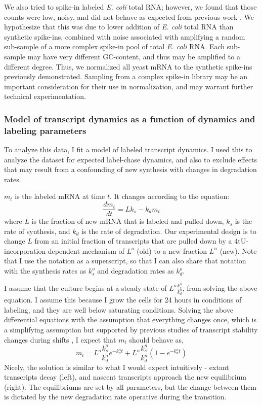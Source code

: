 We also tried to spike-in labeled \textit{E. coli} total RNA; 
however, we found
that those counts were low, noisy, and did not behave as expected
from previous work \parencite{neymotin2014determination}. We
hypothesize that this was due to lower addition of \textit{E. coli} 
total RNA than synthetic spike-ins, 
combined with noise associated with amplifying a
random sub-sample of a more complex spike-in pool of total \textit{E.
coli} RNA. Each sub-sample may have very different GC-content, and
thus may be amplified to a different degree.
Thus, we normalized all yeast mRNA to the synthetic spike-ins previously
demonstrated.
Sampling from a complex spike-in library may be an important
consideration for their use in normalization, and may warrant further
technical experimentation.

\subsubsection{Model of transcript dynamics as a function of 
dynamics and labeling parameters}

To analyze this data, I fit a model of 
labeled transcript dynamics.
I used this to analyze the dataset for expected label-chase
dynamics, and also to exclude effects that may result from a
confounding of new synthesis with changes in degradation rates.

\(m_t\) is the labeled mRNA at time \(t\). It changes according to the
equation: \[ \frac{d m_t}{dt} = L k_s - k_d m_t\] where \(L\) is the
fraction of new mRNA that is labeled and pulled down, \(k_s\) is the
rate of synthesis, and \(k_d\) is the rate of degradation. Our
experimental design is to change \(L\) from an initial fraction of
transcripts that are pulled down by a 4tU-incorporation-dependent
mechanism of \(L^o\) (old) to a new fraction \(L^n\) (new). Note that
I use the notation as a superscript, so that I can also share that
notation with the synthesis rates as \(k_s^o\) and degradation rates as
\(k_d^o\).

I assume that the culture begins at a steady state of
\(L^{o}\frac{k_s^{o}}{k_d^{o}}\), from solving the above equation.
I assume this because I grow the cells for 24 hours in conditions
of labeling, and they are well below saturating conditions.
Solving the above differential equations with the assumption that
everything changes once, which is a simplifying assumption but supported
by previous studies of transcript stability changes during shifts
\parencite{perez2013eukaryotic}, I expect that \(m_t\) should behave
as, \[ m_t = L^o \frac{k_s^o}{k_d^o} e^{-k_d^n t} + 
  L^n\frac{k_s^n}{k_d^n}(1-e^{-k_d^n t}) \] Nicely, the solution is
similar to what I would expect intuitively - extant transcripts decay
(left), and nascent transcripts approach the new equilibrium (right).
The equilibriums are set by all parameters, but the change between them
is dictated by the new degradation rate operative during the transition.

